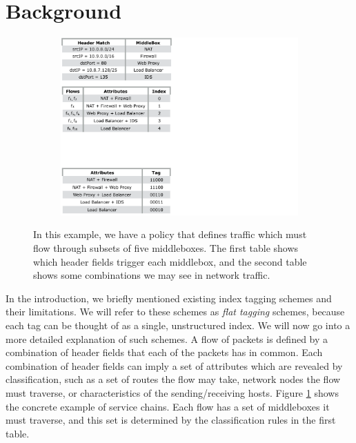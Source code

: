 \section{Background}

\begin{figure}[t!] 
\begin{minipage}{1\linewidth}
\begin{subfigure}[c]{0.96\linewidth}
\includegraphics[trim={0 12cm 19cm 0}, clip, width=\linewidth]{figures/mbox_path_example3}
\end{subfigure} 
\end{minipage} 
\caption{In this example, we have a policy that defines traffic which must flow through subsets of five middleboxes. The first table shows which header fields trigger each middlebox, and the second table shows some combinations we may see in network traffic. }
\label{fig:mbox_policies}
\end{figure}

In the introduction, we briefly mentioned existing index tagging schemes and their limitations. We will refer to these schemes as \textit{flat tagging} schemes, because each tag can be thought of as a single, unstructured index.  We will now go into a more detailed explanation of such schemes. A flow of packets is defined by a combination of header fields that each of the packets has in common. Each combination of header fields can imply a set of attributes which are revealed by classification, such as a set of routes the flow may take, network nodes the flow must traverse, or characteristics of the sending/receiving hosts. Figure \ref{fig:mbox_policies} shows the concrete example of service chains. Each flow has a set of middleboxes it must traverse, and this set is determined by the classification rules in the first table.

